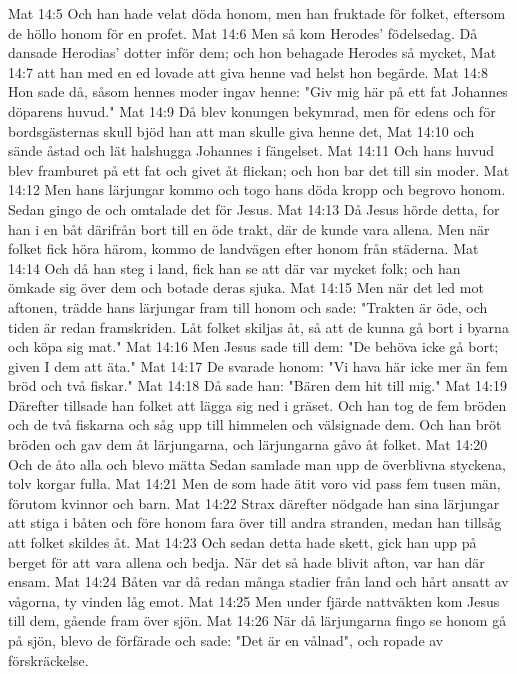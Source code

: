 Mat 14:5  Och han hade velat döda honom, men han fruktade för folket, eftersom de höllo honom för en profet.
Mat 14:6  Men så kom Herodes' födelsedag. Då dansade Herodias' dotter inför dem; och hon behagade Herodes så mycket,
Mat 14:7  att han med en ed lovade att giva henne vad helst hon begärde.
Mat 14:8  Hon sade då, såsom hennes moder ingav henne: "Giv mig här på ett fat Johannes döparens huvud."
Mat 14:9  Då blev konungen bekymrad, men för edens och för bordsgästernas skull bjöd han att man skulle giva henne det,
Mat 14:10  och sände åstad och lät halshugga Johannes i fängelset.
Mat 14:11  Och hans huvud blev framburet på ett fat och givet åt flickan; och hon bar det till sin moder.
Mat 14:12  Men hans lärjungar kommo och togo hans döda kropp och begrovo honom. Sedan gingo de och omtalade det för Jesus.
Mat 14:13  Då Jesus hörde detta, for han i en båt därifrån bort till en öde trakt, där de kunde vara allena. Men när folket fick höra härom, kommo de landvägen efter honom från städerna.
Mat 14:14  Och då han steg i land, fick han se att där var mycket folk; och han ömkade sig över dem och botade deras sjuka.
Mat 14:15  Men när det led mot aftonen, trädde hans lärjungar fram till honom och sade: "Trakten är öde, och tiden är redan framskriden. Låt folket skiljas åt, så att de kunna gå bort i byarna och köpa sig mat."
Mat 14:16  Men Jesus sade till dem: "De behöva icke gå bort; given I dem att äta."
Mat 14:17  De svarade honom: "Vi hava här icke mer än fem bröd och två fiskar."
Mat 14:18  Då sade han: "Bären dem hit till mig."
Mat 14:19  Därefter tillsade han folket att lägga sig ned i gräset. Och han tog de fem bröden och de två fiskarna och såg upp till himmelen och välsignade dem. Och han bröt bröden och gav dem åt lärjungarna, och lärjungarna gåvo åt folket.
Mat 14:20  Och de åto alla och blevo mätta Sedan samlade man upp de överblivna styckena, tolv korgar fulla.
Mat 14:21  Men de som hade ätit voro vid pass fem tusen män, förutom kvinnor och barn.
Mat 14:22  Strax därefter nödgade han sina lärjungar att stiga i båten och före honom fara över till andra stranden, medan han tillsåg att folket skildes åt.
Mat 14:23  Och sedan detta hade skett, gick han upp på berget för att vara allena och bedja. När det så hade blivit afton, var han där ensam.
Mat 14:24  Båten var då redan många stadier från land och hårt ansatt av vågorna, ty vinden låg emot.
Mat 14:25  Men under fjärde nattväkten kom Jesus till dem, gående fram över sjön.
Mat 14:26  När då lärjungarna fingo se honom gå på sjön, blevo de förfärade och sade: "Det är en vålnad", och ropade av förskräckelse.
